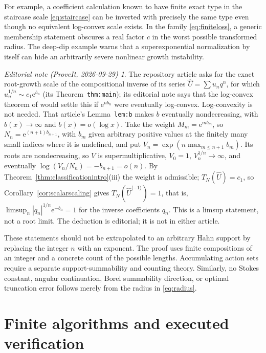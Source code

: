 \documentclass[11pt,a4paper]{article}
\numberwithin{equation}{section}
\theoremstyle{definition}
\theoremstyle{remark}
\newtheorem*{ednote}{Editorial note (ProveIt, 2026-09-29)}
\newcommand{\Type}{T_N}
\newcommand{\inv}[1]{#1^{\langle-1\rangle}}
\newcommand{\ee}{\mathrm e}
\begin{document}
For example, a coefficient calculation known to have finite exact type
in the staircase scale \eqref{eq:staircase} can be inverted with precisely
the same type even though no equivalent log-convex scale exists. In the
family \eqref{eq:finiteloss}, a generic membership statement obscures a
real factor $c$ in the worst possible transformed radius. The deep-dip
example warns that a superexponential normalization by itself can hide
an arbitrarily severe nonlinear growth instability.
\begin{ednote}
The repository article 
asks for the exact root-growth scale of the compositional inverse of its
series $\widehat U=\sum u_nq^n$, for which $u_n^{1/n}\sim c_1\ee^{b_n}$
(its Theorem~\texttt{thm:main}); its editorial note says that the
log-convex theorem of \cite{repo-weight} would settle this if $\ee^{nb_n}$
were eventually log-convex. Log-convexity is not needed. That article's
Lemma~\texttt{lem:b} makes $b$ eventually nondecreasing, with
$b(x)\to\infty$ and $b(x)=o(\log x)$. Take the weight $M_m=\ee^{mb_m}$,
so $N_n=\ee^{(n+1)b_{n+1}}$, with $b_m$ given arbitrary positive values at
the finitely many small indices where it is undefined, and put
$V_n=\exp(n\max_{m\le n+1}b_m)$. Its roots are nondecreasing, so $V$ is
supermultiplicative, $V_0=1$, $V_n^{1/n}\to\infty$, and eventually
$\log(V_n/N_n)=-b_{n+1}=o(n)$. By
Theorem~\ref{thm:classificationintro}(iii) the weight is admissible;
$\Type(\widehat U)=c_1$, so Corollary~\ref{cor:scalarscaling} gives
$\Type(\inv{\widehat U})=1$, that is,
$\limsup_n|q_n|^{1/n}\ee^{-b_n}=1$ for the inverse coefficients $q_n$.
This is a limsup statement, not a root limit. The deduction is editorial;
it is not in either article.
\end{ednote}

These statements should not be extrapolated to an arbitrary Hahn support
by replacing the integer $n$ with an exponent. The proof uses finite
compositions of an integer and a concrete count of the possible lengths.
Accumulating action sets require a separate support-summability and
counting theory. Similarly, no Stokes constant, angular continuation,
Borel summability direction, or optimal truncation error follows merely
from the radius in \eqref{eq:radius}.

\section{Finite algorithms and executed verification}
\label{sec:verification}
\end{document}
